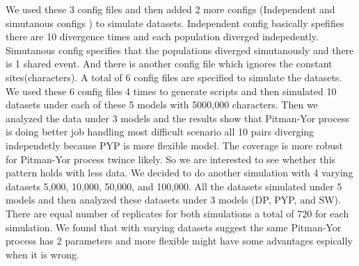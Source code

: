 We used these 3 config files and then added 2 more configs (Independent and simutanous configs ) to simulate datasets. Independent config 
basically spefifies there are 10 divergence times and each population diverged indepedently. Simutanous config specifies that the populations 
diverged simutanously and there is 1 shared event. And there is another config file which ignores the constant sites(characters). A total of 6 config 
files are specified to simulate the datasets. We used these 6 config files 4 times to generate scripts and then simulated 10 datasets under each of 
these 5 models with 5000,000 characters. Then we analyzed the data under 3 models and the results show that Pitman-Yor process is doing better job handling 
most difficult scenario all 10 pairs diverging independetly because PYP is more flexible model. The coverage is more robust for Pitman-Yor process twince likely.
So we are interested to see whether this pattern holds with less data. We decided to do another simulation with 4 varying datasets 5,000, 10,000, 50,000, and 100,000. 
All the datasets simulated under 5 models and then analyzed these datasets under 3 models (DP, PYP, and SW). There are equal number of replicates for both simulations 
a total of 720 for each simulation. We found that with varying datasets suggest the same Pitman-Yor process has 2 parameters and more flexible might 
have some advantages espically when it is wrong.
 

 



 
 
      


